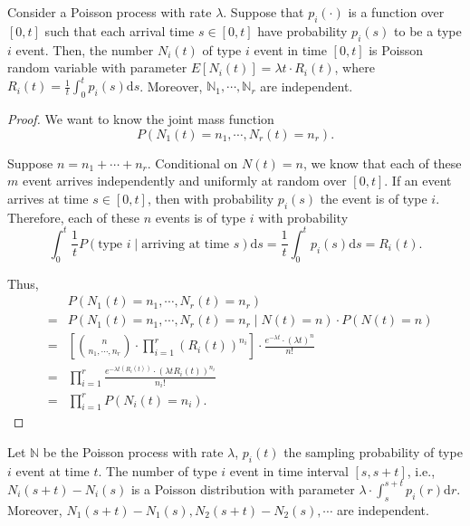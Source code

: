 \begin{corollary}[推論]
Consider a Poisson process with rate $ \lambda $. Suppose that $ p_{i}(\cdot) $ is a function over $ [0, t] $ such that each arrival time $ s \in [0, t] $ have probability $ p_{i}(s) $ to be a type $ i $ event. Then, the number $ N_{i}(t) $ of type $ i $ event in time $ [0, t] $ is Poisson random variable with parameter $ E[N_{i}(t)] = \lambda t \cdot R_{i}(t) $, where $ R_{i}(t) = \frac{1}{t} \int_{0}^{t} p_{i}(s) \mathrm{d}s $. Moreover, $ \mathbb{N}_{1}, \cdots, \mathbb{N}_{r} $ are independent.

\begin{proof}
We want to know the joint mass function
\[ P(N_{1}(t) = n_{1}, \cdots, N_{r}(t) = n_{r}). \]

Suppose $ n = n_{1} + \cdots + n_{r} $. Conditional on $ N(t) = n $, we know that each of these $ m $ event arrives independently and uniformly at random over $ [0, t] $. If an event arrives at time $ s \in [0, t] $, then with probability $ p_{i}(s) $ the event is of type $ i $. Therefore, each of these $ n $ events is of type $ i $ with probability
\[ \int_{0}^{t} \frac{1}{t} P(\text{type } i \mid \text{arriving at time } s) \mathrm{d}s = \frac{1}{t} \int_{0}^{t}  p_{i}(s) \mathrm{d}s = R_{i}(t). \]

Thus,
\begin{eqnarray*}
  &   & P(N_{1}(t) = n_{1}, \cdots, N_{r}(t) = n_{r}) \\
  & = & P(N_{1}(t) = n_{1}, \cdots, N_{r}(t) = n_{r} \mid N(t) = n) \cdot P(N(t) = n) \\
  & = & \left[ {{n}\choose{n_{1}, \cdots, n_{r}}} \cdot \prod_{i = 1}^{r} (R_{i}(t))^{n_{i}} \right] \cdot \frac{e^{-\lambda t} \cdot (\lambda t)^{n}}{n!} \\
  & = & \prod_{i = 1}^{r} \frac{e^{-\lambda t (R_{i}(t))} \cdot (\lambda t R_{i}(t))^{n_{i}}}{n_{i}!} \\
  & = & \prod_{i = 1}^{r} P(N_{i}(t) = n_{i}).
\end{eqnarray*}
\end{proof}
\end{corollary}

\begin{corollary}[推廣推論] \label{cor:ext_cor}
Let $ \mathbb{N} $ be the Poisson process with rate $ \lambda $, $ p_{i}(t) $ the sampling probability of type $ i $ event at time $ t $. The number of type $ i $ event in time interval $ [s, s + t] $, i.e., $ N_{i}(s + t) - N_{i}(s) $ is a Poisson distribution with parameter $ \lambda \cdot \int_{s}^{s + t} p_{i}(r) \mathrm{d}r $. Moreover, $ N_{1}(s + t) - N_{1}(s), N_{2}(s + t) - N_{2}(s), \cdots $ are independent.
\end{corollary}

